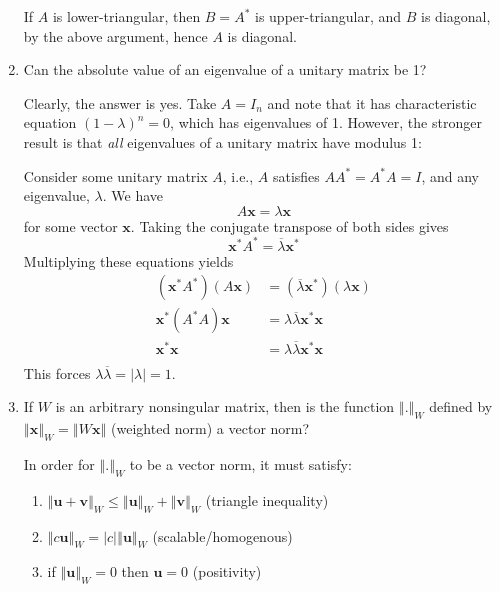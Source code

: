 \begin{enumerate}
\begin{solution}
        If \(A\) is lower-triangular, then \(B=A^*\) is upper-triangular, and \(B\) is diagonal, by the above argument, hence \(A\) is diagonal.
\end{solution}
\item Can the absolute value of an eigenvalue of a unitary matrix be 1?
\begin{solution}
    Clearly, the answer is yes. Take \(A=I_n\) and note that it has characteristic equation \((1-\lambda)^n=0\), which has eigenvalues of 1. However, the stronger result is that \textit{all} eigenvalues of a unitary matrix have modulus 1:
    
Consider some unitary matrix \(A\), i.e., \(A\) satisfies \(AA^*=A^*A=I\), and any eigenvalue, \(\lambda\). We have \[A\mathbf{x}=\lambda\mathbf{x}\] for some vector \(\mathbf{x}\). Taking the conjugate transpose of both sides gives \[\mathbf{x}^*A^*=\overline{\lambda}\mathbf{x}^*\] Multiplying these equations yields \begin{align*}\left(\mathbf{x}^*A^*\right)\left(A\mathbf{x}\right)&=\left(\overline{\lambda}\mathbf{x}^*\right)\left(\lambda\mathbf{x}\right)\\\mathbf{x}^*\left(A^*A\right)\mathbf{x}&=\lambda\overline{\lambda}\mathbf{x}^*\mathbf{x}\\\mathbf{x}^*\mathbf{x}&=\lambda\overline{\lambda}\mathbf{x}^*\mathbf{x}\\\end{align*}This forces \(\lambda\overline{\lambda}=|\lambda|=1\).
\end{solution}
\item If \(W\) is an arbitrary nonsingular matrix, then is the function \(\left\Vert.\right\Vert_W\) defined by \(\left\Vert\mathbf{x}\right\Vert_W=\left\Vert W\mathbf{x}\right\Vert\) (weighted norm) a vector norm?
\begin{solution}
    In order for \(\left\Vert.\right\Vert_W\) to be a vector norm, it must satisfy:
    \begin{enumerate}[1.]
        \item \(\left\Vert\mathbf{u} + \mathbf{v}\right\Vert_W \leq \left\Vert\mathbf{u}\right\Vert_W + \left\Vert\mathbf{v}\right\Vert_W\) (triangle inequality)
        \item \(\left\Vert c\mathbf{u}\right\Vert_W=|c|\left\Vert\mathbf{u}\right\Vert_W\) (scalable/homogenous)
        \item if \(\left\Vert \mathbf{u}\right\Vert_W = 0\) then \(\mathbf{u}=0\) (positivity)
    \end{enumerate}

\end{solution}
\end{enumerate}
